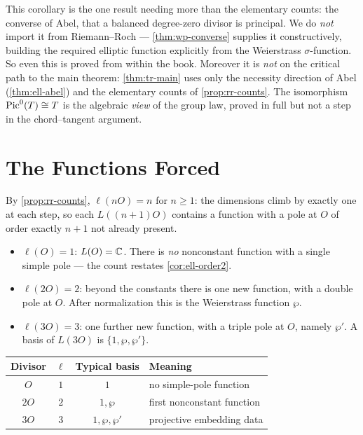 \begin{remark}
\label{rem:rr-existence}
This corollary is the one result needing more than the elementary counts: the
converse of Abel, that a balanced degree-zero divisor is principal. We do
\emph{not} import it from Riemann--Roch --- \cref{thm:wp-converse} supplies it
constructively, building the required elliptic function explicitly from the
Weierstrass \(\sigma\)-function. So even this is proved from within the book.
Moreover it is \emph{not} on the critical path to the main theorem:
\cref{thm:tr-main} uses only the necessity direction of Abel (\cref{thm:ell-abel})
and the elementary counts of \cref{prop:rr-counts}. The isomorphism
\(\operatorname{Pic}^0(T) \cong T\) is the algebraic \emph{view} of the group law, proved in full
but not a step in the chord--tangent argument.
\end{remark}

\section{The Functions Forced}
\label{sec:rr-functions}

By \cref{prop:rr-counts}, \(\ell(nO) = n\) for \(n \ge 1\): the dimensions climb by
exactly one at each step, so each \(L((n{+}1)O)\) contains a function with a pole
at \(O\) of order exactly \(n+1\) not already present.

\begin{itemize}
\item \(\ell(O) = 1\): \(L(O) = \mathbb{C}\). There is \emph{no} nonconstant function with
  a single simple pole --- the count restates \cref{cor:ell-order2}.
\item \(\ell(2O) = 2\): beyond the constants there is one new function, with a
  double pole at \(O\). After normalization this is the Weierstrass function
  \(\wp\).
\item \(\ell(3O) = 3\): one further new function, with a triple pole at \(O\),
  namely \(\wp'\). A basis of \(L(3O)\) is \(\{1, \wp, \wp'\}\).
\end{itemize}

\begin{center}
\begin{tabular}{c|c|c|l}
Divisor & \(\ell\) & Typical basis & Meaning\\
\hline
\(O\)  & \(1\) & \(1\)            & no simple-pole function\\
\(2O\) & \(2\) & \(1, \wp\)       & first nonconstant function\\
\(3O\) & \(3\) & \(1, \wp, \wp'\) & projective embedding data
\end{tabular}
\end{center}

